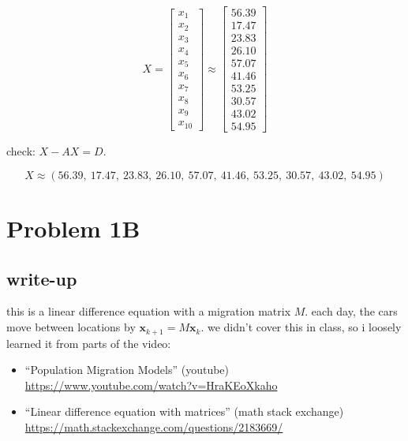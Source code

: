 \documentclass{article}
\begin{document}
\[
X =
\begin{bmatrix}
x_1 \\ x_2 \\ x_3 \\ x_4 \\ x_5 \\ x_6 \\ x_7 \\ x_8 \\ x_9 \\ x_{10}
\end{bmatrix}
\approx
\begin{bmatrix}
56.39 \\ 17.47 \\ 23.83 \\ 26.10 \\ 57.07 \\ 41.46 \\ 53.25 \\ 30.57 \\ 43.02 \\ 54.95
\end{bmatrix}
\]

check: $X - AX = D$. \checkmark

\[
\boxed{
X \approx (56.39,\ 17.47,\ 23.83,\ 26.10,\ 57.07,\ 41.46,\ 53.25,\ 30.57,\ 43.02,\ 54.95)
}
\]

\section*{Problem 1B}

\subsection*{write-up}

this is a linear difference equation with a migration matrix $M$.
each day, the cars move between locations by $\mathbf{x}_{k+1} = M\mathbf{x}_k$.
we didn't cover this in class, so i loosely learned it from parts of the video:

\begin{itemize}
  \item ``Population Migration Models'' (youtube) \\
        \url{https://www.youtube.com/watch?v=HraKEoXkaho}
  \item ``Linear difference equation with matrices'' (math stack exchange) \\
        \url{https://math.stackexchange.com/questions/2183669/}
\end{itemize}
\end{document}
